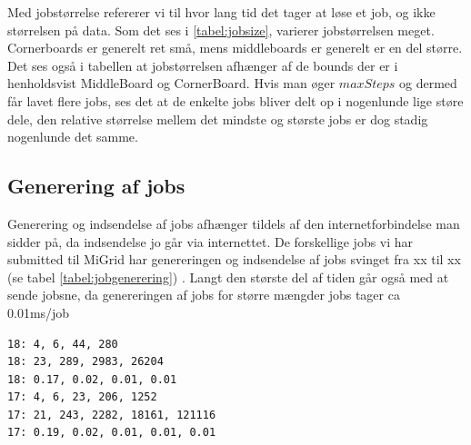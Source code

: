 Med jobstørrelse refererer vi til hvor lang tid det tager at løse et job, og
ikke størrelsen på data. 
Som det ses i \ref{tabel:jobsize}, varierer jobstørrelsen
meget. Cornerboards er generelt ret små, mens middleboards er generelt er en del
større. Det ses også i tabellen at jobstørrelsen afhænger af de bounds der er i
henholdsvist MiddleBoard og CornerBoard. Hvis man øger $maxSteps$ og dermed får
lavet flere jobs, ses det at de enkelte jobs bliver delt op i nogenlunde lige
støre dele, den relative størrelse mellem det mindste og største jobs er dog
stadig nogenlunde det samme. 

\subsection{Generering af jobs}

Generering og indsendelse af jobs afhænger tildels af den internetforbindelse
man sidder på, da indsendelse jo går via internettet. De forskellige jobs vi har
submitted til MiGrid har genereringen og indsendelse af jobs svinget fra xx til
xx (se tabel \ref{tabel:jobgenerering}) . Langt den største del af tiden går også med at sende jobsne,
da genereringen af jobs for større mængder jobs tager ca 0.01ms/job
\begin{verbatim}
18: 4, 6, 44, 280
18: 23, 289, 2983, 26204
18: 0.17, 0.02, 0.01, 0.01
17: 4, 6, 23, 206, 1252
17: 21, 243, 2282, 18161, 121116
17: 0.19, 0.02, 0.01, 0.01, 0.01
\end{verbatim}
